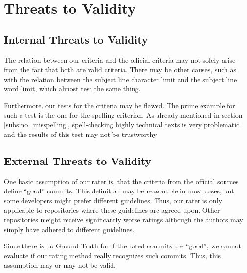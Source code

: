 \section{Threats to Validity}
\label{sec:threats-to-validity}
%


\subsection{Internal Threats to Validity}
\label{sec:internal-threats}

The relation between our criteria and the official criteria may not solely arise from the fact that both are valid criteria. There may be other causes, such as with the relation between the subject line character limit and the subject line word limit, which almost test the same thing.

Furthermore, our tests for the criteria may be flawed. The prime example for such a test is the one for the spelling criterion. As already mentioned in section \ref{subs:no_misspelling}, spell-checking highly technical texts is very problematic and the results of this test may not be trustworthy.

\subsection{External Threats to Validity}
\label{sec:external-threats}

One basic assumption of our rater is, that the criteria from the official sources define ``good'' commits. This definition may be reasonable in most cases, but some developers might prefer different guidelines. Thus, our rater is only applicable to repositories where these guidelines are agreed upon. Other repositories meight receive significantly worse ratings although the authors may simply have adhered to different guidelines.

Since there is no Ground Truth for if the rated commits are ``good'', we cannot evaluate if our rating method really recognizes such commits. Thus, this assumption may or may not be valid.
